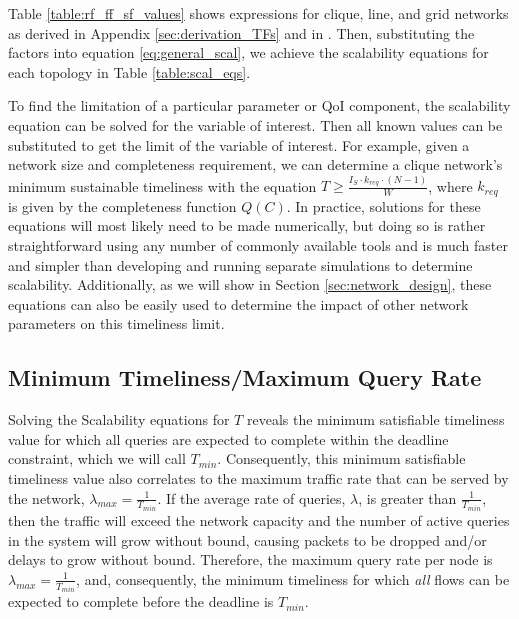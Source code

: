 Table \ref{table:rf_ff_sf_values} shows expressions for clique, line, and grid networks as derived in Appendix \ref{sec:derivation_TFs} and in \cite{symptotics_journal}.  Then, substituting the factors into equation \ref{eq:general_scal}, we achieve the scalability equations for each topology in Table \ref{table:scal_eqs}.  


To find the limitation of a particular parameter or QoI component, the scalability equation can be solved for the variable of interest.  Then all known values can be substituted to get the limit of the variable of interest.  For example, given a network size and completeness requirement, we can determine a clique network's minimum sustainable timeliness with the equation $T  \geq \frac{I_S \cdot k_{req} \cdot (N-1)}{W}$, where $k_{req}$ is given by the completeness function $Q(C)$.  In practice, solutions for these equations will most likely need to be made numerically, but doing so is rather straightforward using any number of commonly available tools and is much faster and simpler than developing and running separate simulations to determine scalability.  Additionally, as we will show in Section \ref{sec:network_design}, these equations can also be easily used to determine the impact of other network parameters on this timeliness limit. 

\subsection{Minimum Timeliness/Maximum Query Rate}

Solving the Scalability equations for $T$ reveals the minimum satisfiable timeliness value for which all queries are expected to complete within the deadline constraint, which we will call $T_{min}$.  Consequently, this minimum satisfiable timeliness value also correlates to the maximum traffic rate that can be served by the network, $\lambda_{max} = \frac{1}{T_{min}}$.  If the average rate of queries, $\lambda$, is greater than $\frac{1}{T_{min}}$, then the traffic will exceed the network capacity and the number of active queries in the system will grow without bound, causing packets to be dropped and/or delays to grow without bound.  Therefore, the maximum query rate per node is $\lambda_{max} = \frac{1}{T_{min}}$, and, consequently, the minimum timeliness for which \emph{all} flows can be expected to complete before the deadline is $T_{min}$.


